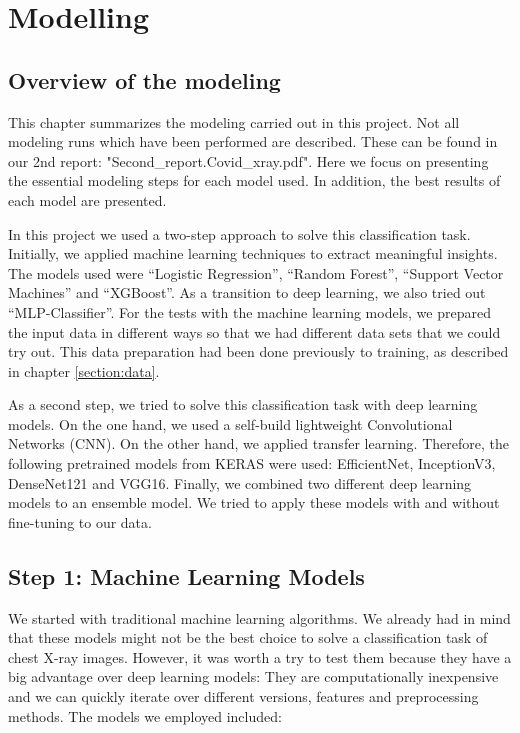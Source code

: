 \documentclass{article}
\begin{document}
\section{Modelling} \label{section:modelling}


\subsection{Overview of the modeling}
This chapter summarizes the modeling carried out in this project. Not all modeling runs which have been performed are described. These can be found in our 2nd report: "Second\_report.Covid\_xray.pdf". Here we focus on presenting the essential modeling steps for each model used. In addition, the best results of each model are presented. 

In this project we used a two-step approach to solve this classification task. Initially, we applied machine learning techniques to extract meaningful insights. The models used were “Logistic Regression”, “Random Forest”, “Support Vector Machines” and “XGBoost”. As a transition to deep learning, we also tried out “MLP-Classifier”. For the tests with the machine learning models, we prepared the input data in different ways so that we had different data sets that we could try out. This data preparation had been done previously to training, as described in chapter \ref{section:data}.

As a second step, we tried to solve this classification task with deep learning models. On the one hand, we used a self-build lightweight Convolutional Networks (CNN). On the other hand, we applied transfer learning. Therefore, the following pretrained models from KERAS were used: EfficientNet, InceptionV3, DenseNet121 and VGG16. Finally, we combined two different deep learning models to an ensemble model. We tried to apply these models with and without fine-tuning to our data. 


\subsection{Step 1: Machine Learning Models}
We started with traditional machine learning algorithms. We already had in mind that these models might not be the best choice to solve a classification task of chest X-ray images. However, it was worth a try to test them because they have a big advantage over deep learning models: They are computationally inexpensive and we can quickly iterate over different versions, features and preprocessing methods. The models we employed included:
\end{document}
